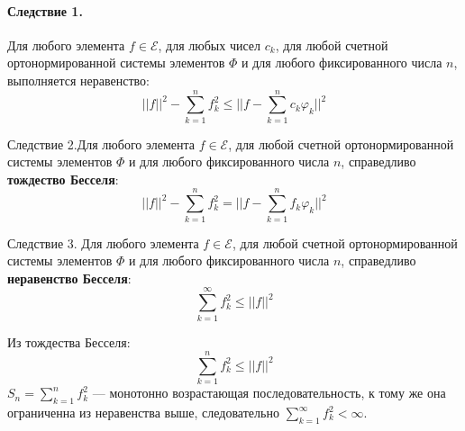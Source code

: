 \paragraph{Следствие 1.} Для любого элемента $ f \in \mathcal{E} $, для любых чисел $ c_k $, для любой счетной ортонормированной системы элементов $ \Phi  $ и для любого фиксированного числа $ n $, выполняется неравенство:
\[
||f||^2 - \sum_{k=1}^n f_k^2 \leqslant ||f-\sum_{k=1}^n c_k\varphi_k||^2
\]
\begin{greySmth}{Следствие 2.}Для любого элемента $ f \in \mathcal{E} $, для любой счетной ортонормированной системы элементов $ \Phi  $ и для любого фиксированного числа $ n $, справедливо \textbf{тождество Бесселя}:
\[
||f||^2 -\sum_{k=1}^n f_k^2 = ||f-\sum_{k=1}^n f_k\varphi_k||^2
\]
\end{greySmth}
\begin{greySmth}{Следствие 3.} Для любого элемента $ f \in \mathcal{E} $, для любой счетной ортонормированной системы элементов $ \Phi  $ и для любого фиксированного числа $ n $, справедливо \textbf{неравенство Бесселя}:
\[
\sum_{k=1}^\infty f_k^2 \leqslant ||f||^2
\]
\end{greySmth}
\begin{greyProof}
	Из тождества Бесселя:
	\[
	\sum_{k=1}^n f_k^2 \leqslant ||f||^2
	\]
	$ S_n = \sum_{k=1}^n f_k^2 $ --- монотонно возрастающая последовательность, к тому же она ограниченна из неравенства выше, следовательно $ \sum_{k=1}^{\infty} f_k^2 < \infty $. 
\end{greyProof}
